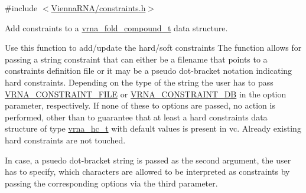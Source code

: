 {\ttfamily \#include $<$\hyperlink{constraints_8h}{Vienna\+R\+N\+A/constraints.\+h}$>$}



Add constraints to a \hyperlink{group__fold__compound_ga1b0cef17fd40466cef5968eaeeff6166}{vrna\+\_\+fold\+\_\+compound\+\_\+t} data structure. 

Use this function to add/update the hard/soft constraints The function allows for passing a string \textquotesingle{}constraint\textquotesingle{} that can either be a filename that points to a constraints definition file or it may be a pseudo dot-\/bracket notation indicating hard constraints. Depending on the type of the string the user has to pass \hyperlink{group__constraints_ga62e0ed0c33002c09423de4e646f85a2b}{V\+R\+N\+A\+\_\+\+C\+O\+N\+S\+T\+R\+A\+I\+N\+T\+\_\+\+F\+I\+L\+E} or \hyperlink{group__constraints_ga4bfc2f15c4f261c62a11af9d2aa80c90}{V\+R\+N\+A\+\_\+\+C\+O\+N\+S\+T\+R\+A\+I\+N\+T\+\_\+\+D\+B} in the option parameter, respectively. If none of these to options are passed, no action is performed, other than to guarantee that at least a hard constraints data structure of type \hyperlink{group__constraints_gac7e4c4f8abe3163a68110c5bff24e01d}{vrna\+\_\+hc\+\_\+t} with default values is present in \textquotesingle{}vc\textquotesingle{}. Already existing hard constraints are not touched.

In case, a psuedo dot-\/bracket string is passed as the second argument, the user has to specify, which characters are allowed to be interpreted as constraints by passing the corresponding options via the third parameter.

